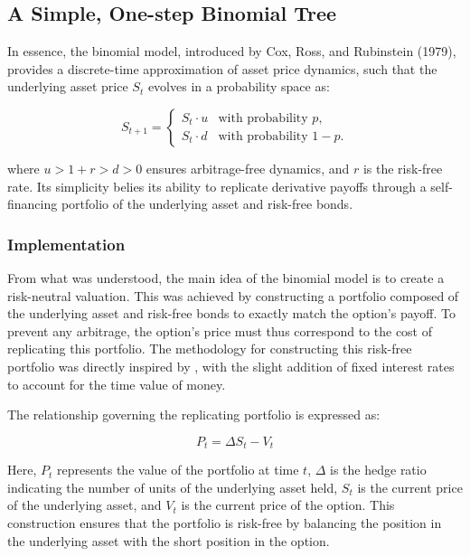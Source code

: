 \documentclass{article}
\begin{document}
    \subsection{A Simple, One-step Binomial Tree}

    In essence, the binomial model, introduced by Cox, Ross, and Rubinstein (1979), provides a discrete-time approximation of asset price dynamics, such that the underlying asset price \( S_t \) evolves in a probability space as:

    \[
        S_{t+1} =
        \begin{cases}
            S_t \cdot u & \text{with probability } p, \\
            S_t \cdot d & \text{with probability } 1 - p.
        \end{cases}
    \]

    where \( u > 1 + r > d > 0 \) ensures arbitrage-free dynamics, and \( r \) is the risk-free rate. Its simplicity belies its ability to replicate derivative payoffs through a self-financing portfolio of the underlying asset and risk-free bonds.

    \subsubsection{Implementation}

    From what was understood, the main idea of the binomial model is to create a risk-neutral valuation. This was achieved by constructing a portfolio composed of the underlying asset and risk-free bonds to exactly match the option's payoff. To prevent any arbitrage, the option's price must thus correspond to the cost of replicating this portfolio. The methodology for constructing this risk-free portfolio was directly inspired by \cite{binomial_options_pricing_yt}, with the slight addition of fixed interest rates to account for the time value of money.

    \medskip

    The relationship governing the replicating portfolio is expressed as:

    \begin{equation}
        \label{eq:delta_hedging_portfolio}
        P_t = \Delta S_t - V_t
    \end{equation}

    Here, \( P_t \) represents the value of the portfolio at time \( t \), \( \Delta \) is the hedge ratio indicating the number of units of the underlying asset held, \( S_t \) is the current price of the underlying asset, and \( V_t \) is the current price of the option. This construction ensures that the portfolio is risk-free by balancing the position in the underlying asset with the short position in the option.
\end{document}

